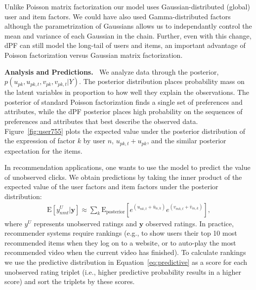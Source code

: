 \documentclass{sig-alternate}
\newcommand{\mypar}[1]{\vspace{0.1in}\noindent \textbf{#1 \,}}
\begin{document}
Unlike \citet{Gopalan:2013b} Poisson matrix factorization our model uses
Gaussian-distributed (global) user and item factors. We could have also used
Gamma-distributed factors \cite{acharya15} although the parametrization of
Gaussians allows us to independantly control the mean and variance of each
Gaussian in the chain.  Further, even with this change, dPF can still model the
long-tail of users and items, an important advantage of Poisson factorization versus
Gaussian matrix factorization\cite{Gopalan:2013b}.









 


\mypar{Analysis and Predictions.} \noindent
We analyze data through the posterior, $p(u_{pk}, u_{pk, t} , v_{pk}, v_{pk, t} | Y)$.
The posterior distribution places probability mass on the latent variables in
proportion to how well they explain the observations. The posterior of
standard Poisson factorization finds a single set of preferences and
attributes, while the dPF posterior places high probability on the sequences of
preferences and attributes that best describe the observed data. Figure~\ref{fig:user755}
plots the expected value under the posterior distribution of the expression of factor
$k$ by user $n$, $u_{pk, t} + u_{pk}$, 
and the similar posterior expectation for the items.


In recommendation applications, one wants to use the model to predict the value
of unobserved clicks. We obtain predictions by taking the inner product of the expected
value of the user factors and item factors under the posterior
distribution:
\begin{eqnarray}
\text{E}[y^U_{nmt}|\mathbf{y}] \approx \sum_k \text{E}_\textrm{posterior} [e^{(u_{nk,t} + \bar{u}_{n,k})} e^{(v_{mk,t} + \bar{v}_{m,k})}], \label{eq:predictive}
\end{eqnarray}
where $y^U$ represents unobserved ratings and $\mathbf{y}$ observed ratings. In practice, recommender systems require rankings (e.g., to show users their top 10 most recommended items when they log on to a website, or to auto-play the most recommended video when the current video has finished). To calculate rankings we use the predictive distribution in Equation~\ref{eq:predictive} as a score for each unobserved rating triplet (i.e., higher predictive probability results in a higher score) and sort the triplets by these scores. 
\end{document}

